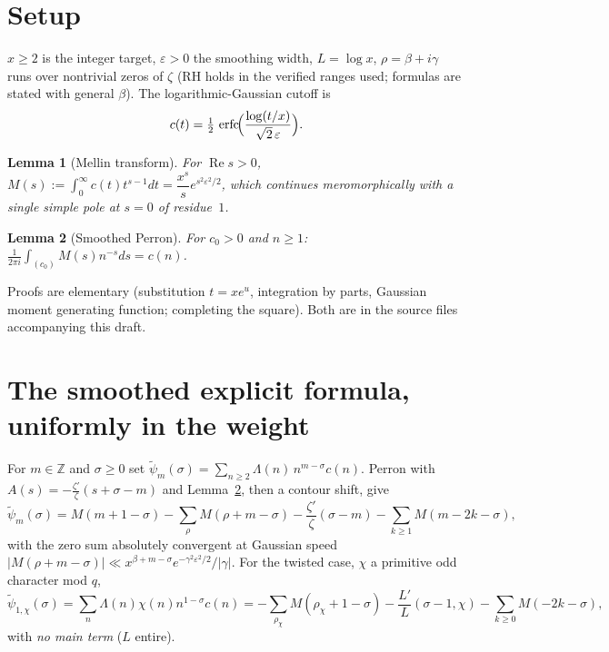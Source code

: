 \documentclass[11pt]{article}
\newtheorem{lemma}{Lemma}
\newcommand{\erfc}{\operatorname{erfc}}
\newcommand{\eps}{\varepsilon}
\begin{document}
\section{Setup}\label{sec:setup}

$x\ge2$ is the integer target, $\eps>0$ the smoothing width, $L=\log x$,
$\rho=\beta+i\gamma$ runs over nontrivial zeros of $\zeta$ (RH holds in the
verified ranges used; formulas are stated with general $\beta$). The
logarithmic-Gaussian cutoff is
\begin{equation}\label{eq:cutoff}
  c(t)=\tfrac12\,\erfc\!\Bigl(\frac{\log(t/x)}{\sqrt2\,\eps}\Bigr).
\end{equation}

\begin{lemma}[Mellin transform]\label{lem:mellin}
For $\operatorname{Re}s>0$,
$M(s):=\int_0^\infty c(t)t^{s-1}dt=\dfrac{x^s}{s}e^{s^2\eps^2/2}$,
which continues meromorphically with a single simple pole at $s=0$ of
residue~$1$.
\end{lemma}

\begin{lemma}[Smoothed Perron]\label{lem:perron}
For $c_0>0$ and $n\ge1$:
$\frac1{2\pi i}\int_{(c_0)}M(s)n^{-s}ds=c(n)$.
\end{lemma}

Proofs are elementary (substitution $t=xe^u$, integration by parts,
Gaussian moment generating function; completing the square). Both are in
the source files accompanying this draft.

\section{The smoothed explicit formula, uniformly in the weight}
\label{sec:explicit}

For $m\in\mathbb Z$ and $\sigma\ge0$ set
$\widetilde\psi_m(\sigma)=\sum_{n\ge2}\Lambda(n)\,n^{m-\sigma}c(n)$.
Perron with $A(s)=-\frac{\zeta'}{\zeta}(s+\sigma-m)$ and
Lemma~\ref{lem:perron}, then a contour shift, give
\begin{equation}\label{eq:explicit}
  \widetilde\psi_m(\sigma)=M(m+1-\sigma)-\sum_{\rho}M(\rho+m-\sigma)
  -\frac{\zeta'}{\zeta}(\sigma-m)-\sum_{k\ge1}M(m-2k-\sigma),
\end{equation}
with the zero sum absolutely convergent at Gaussian speed
$|M(\rho+m-\sigma)|\ll x^{\beta+m-\sigma}e^{-\gamma^2\eps^2/2}/|\gamma|$.
For the twisted case, $\chi$ a primitive odd character mod $q$,
\begin{equation}\label{eq:explicitchi}
  \widetilde\psi_{1,\chi}(\sigma)=\sum_n\Lambda(n)\chi(n)n^{1-\sigma}c(n)
  =-\sum_{\rho_\chi}M(\rho_\chi+1-\sigma)-\frac{L'}{L}(\sigma-1,\chi)
  -\sum_{k\ge0}M(-2k-\sigma),
\end{equation}
with \emph{no main term} ($L$ entire).
\end{document}
